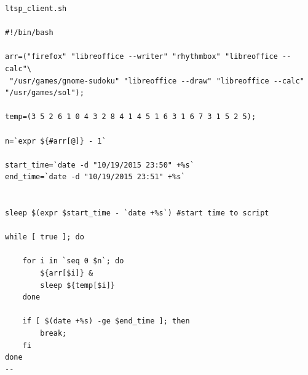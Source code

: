 \documentclass[
	12pt,				%
	openright,			%
	twoside,			%
	a4paper,			%
	chapter=TITLE,		%
	english,			%
	brazil				%
	]{abntex2}
\begin{document}
\begin{apendicesenv}
\begin{verbatim}
ltsp_client.sh

#!/bin/bash

arr=("firefox" "libreoffice --writer" "rhythmbox" "libreoffice --calc"\
 "/usr/games/gnome-sudoku" "libreoffice --draw" "libreoffice --calc" "/usr/games/sol"); 

temp=(3 5 2 6 1 0 4 3 2 8 4 1 4 5 1 6 3 1 6 7 3 1 5 2 5);

n=`expr ${#arr[@]} - 1`

start_time=`date -d "10/19/2015 23:50" +%s`
end_time=`date -d "10/19/2015 23:51" +%s`


sleep $(expr $start_time - `date +%s`) #start time to script

while [ true ]; do
	
	for i in `seq 0 $n`; do
		${arr[$i]} &
		sleep ${temp[$i]}
	done

	if [ $(date +%s) -ge $end_time ]; then
		break;
	fi
done
--
\end{verbatim}




\end{apendicesenv}



\begin{anexosenv}

\partanexos


\end{anexosenv}

\phantompart
\printindex
\end{document}

